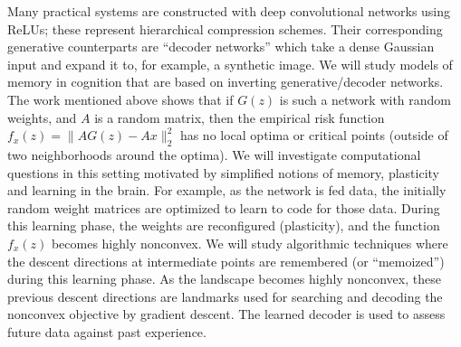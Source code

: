 Many practical systems are constructed with deep convolutional
networks using ReLUs; these represent hierarchical compression
schemes. Their corresponding generative counterparts are ``decoder
networks'' which take a dense Gaussian input and expand it to, for
example, a synthetic image.  We will study models of memory in
cognition that are based on inverting generative/decoder networks. The
work \cite{HandV17} mentioned above shows that if $G(z)$ is such a
network with random weights, and $A$ is a random matrix, then the
empirical risk function $ f_x(z) = \|AG(z) - Ax\|_2^2$ has no local
optima or critical points (outside of two neighborhoods around the
optima). We will investigate computational questions in this setting
motivated by simplified notions of memory, plasticity and learning in
the brain. For example, as the network is fed data, the initially
random weight matrices are optimized to learn to code for those data.
During this learning phase, the weights are reconfigured (plasticity),
and the function $f_x(z)$ becomes highly nonconvex. We will study
algorithmic techniques where the descent directions at intermediate
points are remembered (or ``memoized'') during this learning phase. As
the landscape becomes highly nonconvex, these previous descent
directions are landmarks used for searching and decoding the nonconvex
objective by gradient descent. The learned decoder is used to assess
future data against past experience.

